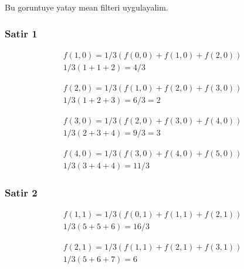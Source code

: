 \documentclass[12pt]{article}
\begin{document}
Bu goruntuye yatay mean filteri uygulayalim.

\subsubsection{Satir 1}

\begin{equation}
\begin{split}
f(1,0) = 1/3 (f(0,0)+f(1,0)+f(2,0)) \\
1/3 (1+1+2) = 4/3 
\end{split}
\end{equation}

\begin{equation}
\begin{split}
f(2,0) = 1/3 (f(1,0)+f(2,0)+f(3,0)) \\
1/3 (1+2+3) = 6/3  = 2
\end{split}
\end{equation}

\begin{equation}
\begin{split}
f(3,0) = 1/3 (f(2,0)+f(3,0)+f(4,0)) \\
1/3 (2+3+4) = 9/3 = 3 
\end{split}
\end{equation}

\begin{equation}
\begin{split}
f(4,0) = 1/3 (f(3,0)+f(4,0)+f(5,0)) \\
1/3 (3+4+4) = 11/3
\end{split}
\end{equation}

\subsubsection{Satir 2}

\begin{equation}
\begin{split}
f(1,1) = 1/3 (f(0,1)+f(1,1)+f(2,1)) \\
1/3 (5+5+6) = 16/3
\end{split}
\end{equation}

\begin{equation}
\begin{split}
f(2,1) = 1/3 (f(1,1)+f(2,1)+f(3,1)) \\
1/3 (5+6+7) = 6
\end{split}
\end{equation}
\end{document}
